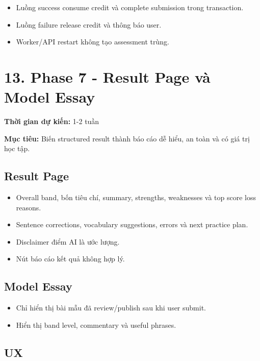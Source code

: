 \documentclass[
  11pt,
  a4paper,
]{article}
\begin{document}
\begin{itemize}
\item
  Luồng success consume credit và complete submission trong transaction.
\item
  Luồng failure release credit và thông báo user.
\item
  Worker/API restart không tạo assessment trùng.
\end{itemize}

\section{13. Phase 7 - Result Page và Model
Essay}\label{phase-7---result-page-vuxe0-model-essay}

\textbf{Thời gian dự kiến:} 1-2 tuần

\textbf{Mục tiêu:} Biến structured result thành báo cáo dễ hiểu, an toàn
và có giá trị học tập.

\subsection{Result Page}\label{result-page}

\begin{itemize}
\item
  Overall band, bốn tiêu chí, summary, strengths, weaknesses và top
  score loss reasons.
\item
  Sentence corrections, vocabulary suggestions, errors và next practice
  plan.
\item
  Disclaimer điểm AI là ước lượng.
\item
  Nút báo cáo kết quả không hợp lý.
\end{itemize}

\subsection{Model Essay}\label{model-essay}

\begin{itemize}
\item
  Chỉ hiển thị bài mẫu đã review/publish sau khi user submit.
\item
  Hiển thị band level, commentary và useful phrases.
\end{itemize}

\subsection{UX}\label{ux}
\end{document}
